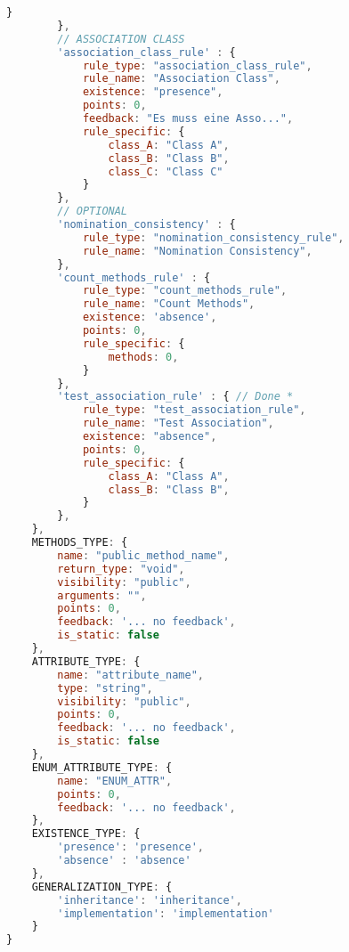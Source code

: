 \begin{lstlisting}[caption={Rules Definition JSON}, label={lst:rules_def}, language=javascript]
            }
        },
        // ASSOCIATION CLASS
        'association_class_rule' : {
            rule_type: "association_class_rule",
            rule_name: "Association Class",
            existence: "presence",
            points: 0,
            feedback: "Es muss eine Asso...",
            rule_specific: {
                class_A: "Class A",
                class_B: "Class B",
                class_C: "Class C"
            }
        },
        // OPTIONAL
        'nomination_consistency' : {
            rule_type: "nomination_consistency_rule",
            rule_name: "Nomination Consistency",
        },
        'count_methods_rule' : {
            rule_type: "count_methods_rule",
            rule_name: "Count Methods",
            existence: 'absence',
            points: 0,
            rule_specific: {
                methods: 0,
            }
        },
        'test_association_rule' : { // Done *
            rule_type: "test_association_rule",
            rule_name: "Test Association",
            existence: "absence",
            points: 0,
            rule_specific: {
                class_A: "Class A",
                class_B: "Class B",
            }
        },
    },
    METHODS_TYPE: {
        name: "public_method_name",
        return_type: "void",
        visibility: "public",
        arguments: "",
        points: 0,
        feedback: '... no feedback',
        is_static: false
    },
    ATTRIBUTE_TYPE: {
        name: "attribute_name",
        type: "string",
        visibility: "public",
        points: 0,
        feedback: '... no feedback',
        is_static: false
    },
    ENUM_ATTRIBUTE_TYPE: {
        name: "ENUM_ATTR",
        points: 0,
        feedback: '... no feedback',
    },
    EXISTENCE_TYPE: {
        'presence': 'presence',
        'absence' : 'absence'
    },
    GENERALIZATION_TYPE: {
        'inheritance': 'inheritance',
        'implementation': 'implementation'
    }
}
\end{lstlisting}